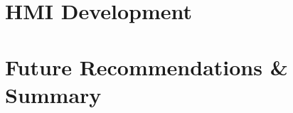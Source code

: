 \documentclass[oneside]{book}
\begin{document}
\chapter{HMI Development}
    \label{chap:hmi}
    
    \newpage
    
\chapter{Future Recommendations \& Summary}
    \label{chap:summary}
    
    \newpage
    
\printbibliography


\end{document}
